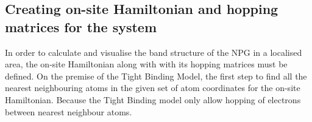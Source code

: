 \subsection{Creating on-site Hamiltonian and hopping matrices for the system}
In order to calculate and visualise the band structure of the NPG in a localised area, the on-site Hamiltonian along with with its hopping matrices must be defined. On the premise of the Tight Binding Model, the first step to find all the nearest neighbouring atoms in the given set of atom coordinates for the on-site Hamiltonian. Because the Tight Binding model only allow hopping of electrons between nearest neighbour atoms.  
